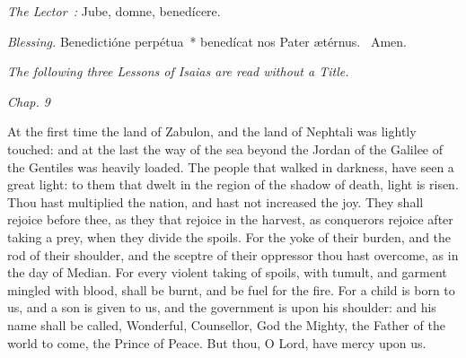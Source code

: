 {{    \emph{The Lector~:} Jube, domne, benedícere.

    \emph{Blessing.} Benedictióne perpétua~* benedícat nos Pater ætérnus. \Rbar{}~Amen.

    \smallskip
    \emph{The following three Lessons of Isaias are read without a Title.}
  }

  \bigskip
  {
    \hspace{10ex}{Lesson I.}\hfill\emph{Chap. 9}\hspace{10ex}

    \begin{parcolumns}[rulebetween,colwidths={1=.44\linewidth}]{2}
    {At the first time the land of Zabulon, and the land of Nephtali was lightly touched: and at the last the way of the sea beyond the Jordan of the Galilee of the Gentiles was heavily loaded.
      The people that walked in darkness, have seen a great light: to them that dwelt in the region of the shadow of death, light is risen.
      Thou hast multiplied the nation, and hast not increased the joy. They shall rejoice before thee, as they that rejoice in the harvest, as conquerors rejoice after taking a prey, when they divide the spoils.
      For the yoke of their burden, and the rod of their shoulder, and the sceptre of their oppressor thou hast overcome, as in the day of Median.
      For every violent taking of spoils, with tumult, and garment mingled with blood, shall be burnt, and be fuel for the fire.
      For a child is born to us, and a son is given to us, and the government is upon his shoulder: and his name shall be called, Wonderful, Counsellor, God the Mighty, the Father of the world to come, the Prince of Peace.
      But thou, O Lord, have mercy upon us.}
    \end{parcolumns}

}}
